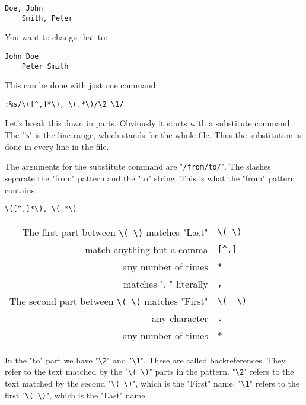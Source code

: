 \begin{Verbatim}[samepage=true]
    Doe, John 
    Smith, Peter 
\end{Verbatim}

You want to change that to:

\begin{Verbatim}[samepage=true]
    John Doe 
    Peter Smith 
\end{Verbatim}

This can be done with just one command:

\begin{Verbatim}[samepage=true]
 :%s/\([^,]*\), \(.*\)/\2 \1/
\end{Verbatim}

Let's break this down in parts.
Obviously it starts with a substitute command.
The "\verb!%!" is the line range, which stands for the whole file.
Thus the substitution is done in every line in the file.

The arguments for the substitute command are "\verb!/from/to/!".
The slashes separate the "from" pattern and the "to" string.
This is what the "from" pattern contains:

\begin{Verbatim}[samepage=true]
	\([^,]*\), \(.*\) 
\end{Verbatim}

\begin{center}
				\begin{longtable}{r l}
								The first part between \verb!\( \)! matches "Last" & \verb!\( \)! \\
								match anything but a comma & \verb![^,]! \\
								any number of times & \verb!*! \\
								matches ", " literally & \verb!,! \\
								The second part between \verb!\( \)! matches "First" & \verb!\(  \)! \\
								any character & \verb!.! \\
								any number of times & \verb!*! \\
				\end{longtable}
\end{center}

In the "to" part we have "\verb!\2!" and "\verb!\1!".
These are called backreferences.
They refer to the text matched by the "\verb!\( \)!" parts in the pattern.
"\verb!\2!" refers to the text matched by the second "\verb!\( \)!", which is the "First" name.
"\verb!\1!" refers to the first "\verb!\( \)!", which is the "Last" name.

